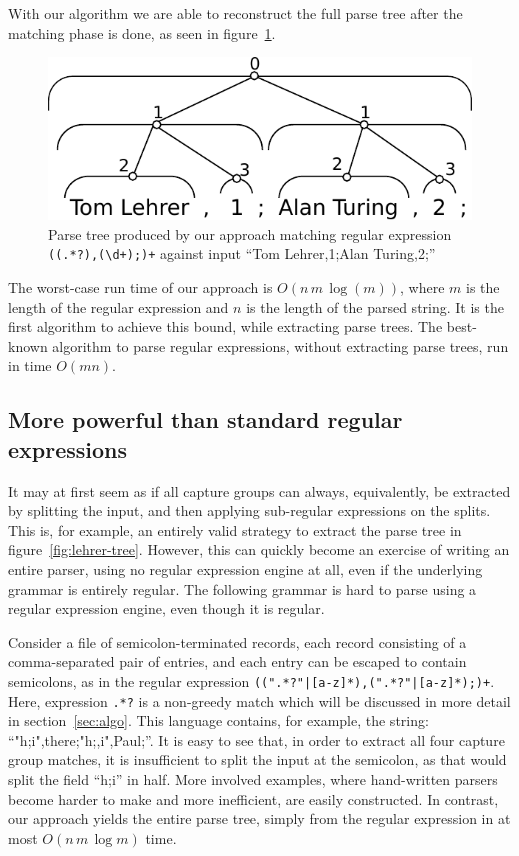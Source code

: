 \documentclass[english,twocolumn]{article}
\theoremstyle{definition}
\newcommand{\Figref}[1]{figure~\ref{fig:#1}}
\newcommand{\Secref}[1]{section~\ref{sec:#1}}
\newcommand{\figlabel}[1]{\label{fig:#1}}
\newcommand{\seclabel}[1]{\label{sec:#1}}
\begin{document}
With our algorithm we are able to reconstruct the full parse
tree after the matching phase is done, as seen in \Figref{our-tree}.

\begin{figure}[htp]
\centering
\includegraphics[width=.75\linewidth]{graphs/full_parse}
\caption{\figlabel{lehrer-tree} Parse tree produced by our approach matching regular expression \texttt{((.*?),(\textbackslash d+);)+} against input ``Tom
Lehrer,1;Alan Turing,2;''}
\figlabel{our-tree}
\end{figure}

The worst-case run time of our approach is $O(n\,m\,\log(m))$, where $m$ is
the length of the regular expression and $n$ is the length of the
parsed string. It is the first algorithm to achieve this bound,
while extracting parse trees. The best-known algorithm to parse
regular expressions, without extracting parse trees, run in time
$O(m n)$\cite{Sedg90a}.

\subsection{More powerful than standard regular expressions}
\seclabel{power}
It may at first seem as if all capture groups can always, equivalently,
be extracted by splitting the input, and then applying sub-regular
expressions on the splits.  This is, for example, an entirely valid
strategy to extract the parse tree in \Figref{lehrer-tree}.  However,
this can quickly become an exercise of writing an entire parser,
using no regular expression engine at all, even if the underlying
grammar is entirely regular.  The following grammar is hard to parse
using a regular expression engine, even though it is regular.

Consider a file of semicolon-terminated records, each record consisting
of a comma-separated pair of entries, and each entry can be escaped
to contain semicolons, as in the regular expression
\texttt{((".*?"|[a-z]*),(".*?"|[a-z]*);)+}. Here, expression
\texttt{.*?} is a non-greedy match which will be discussed in more
detail in \Secref{algo}.  This language contains, for example, the
string: ``"h;i",there;"h;,i",Paul;''.  It is easy to see that, in
order to extract all four capture group matches, it is insufficient
to split the input at the semicolon, as that would split the field
``h;i'' in half.  More involved examples, where hand-written parsers
become harder to make and more inefficient, are easily constructed.
In contrast, our approach yields the entire parse tree, simply from
the regular expression in at most $O(n\,m\,\log m)$ time.
\end{document}
